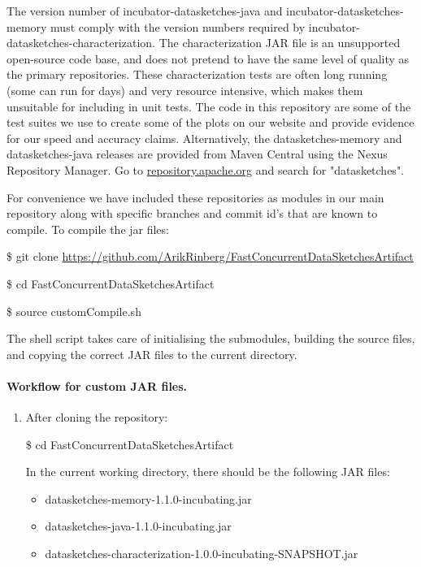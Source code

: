 {\noindent The version number of incubator-datasketches-java
and incubator-datasketches-memory must comply with the version numbers required by incubator-datasketches-characterization.
The characterization JAR file is an unsupported open-source code base, and
does not pretend to have the same level of quality as the primary repositories.
These characterization tests are often long running (some can run for days) and very resource intensive, which makes
them unsuitable for including in unit tests. The code in this repository are some of
the test suites we use to create some of the plots on our website and provide evidence for our speed and accuracy claims.
Alternatively, the datasketches-memory and datasketches-java releases are provided from Maven Central using the Nexus Repository Manager. Go to 
\url{repository.apache.org} and search for "datasketches".

For convenience we have included these repositories as modules in our main repository along with specific branches and commit id's
that are known to compile. To compile the jar files:
\begin{framed}

\$ git clone \url{https://github.com/ArikRinberg/FastConcurrentDataSketchesArtifact}

\$ cd FastConcurrentDataSketchesArtifact

\$ source customCompile.sh

\end{framed}

\noindent The shell script takes care of initialising the submodules, building the source files, and copying the correct
JAR files to the current directory.


\paragraph{\textbf{Workflow for custom JAR files.}}

\begin{enumerate}
  \item After cloning the repository:

  \begin{framed}

  \$ cd FastConcurrentDataSketchesArtifact

  \end{framed}

  \noindent In the current working directory, there should be the following JAR files:

  \begin{itemize}
    \item datasketches-memory-1.1.0-incubating.jar
    \item datasketches-java-1.1.0-incubating.jar
    \item datasketches-characterization-1.0.0-incubating-SNAPSHOT.jar
  \end{itemize}


\end{enumerate}}
